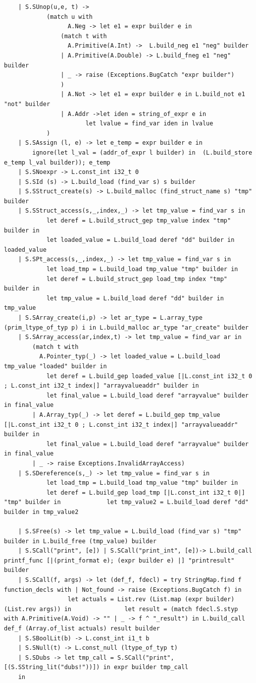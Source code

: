\documentclass{article}
\begin{document}
\begin{lstlisting}
	| S.SUnop(u,e, t) -> 
			(match u with
				  A.Neg -> let e1 = expr builder e in 
				(match t with
				  A.Primitive(A.Int) ->  L.build_neg e1 "neg" builder
				| A.Primitive(A.Double) -> L.build_fneg e1 "neg" builder 
				| _ -> raise (Exceptions.BugCatch "expr builder")
				)
				| A.Not -> let e1 = expr builder e in L.build_not e1 "not" builder
				| A.Addr ->let iden = string_of_expr e in 
					   let lvalue = find_var iden in lvalue
			)
	| S.SAssign (l, e) -> let e_temp = expr builder e in 
		ignore(let l_val = (addr_of_expr l builder) in  (L.build_store e_temp l_val builder)); e_temp
	| S.SNoexpr -> L.const_int i32_t 0
	| S.SId (s) -> L.build_load (find_var s) s builder
	| S.SStruct_create(s) -> L.build_malloc (find_struct_name s) "tmp" builder
	| S.SStruct_access(s,_,index,_) -> let tmp_value = find_var s in 
			let deref = L.build_struct_gep tmp_value index "tmp" builder in 
			let loaded_value = L.build_load deref "dd" builder in loaded_value
	| S.SPt_access(s,_,index,_) -> let tmp_value = find_var s in 
			let load_tmp = L.build_load tmp_value "tmp" builder in 
			let deref = L.build_struct_gep load_tmp index "tmp" builder in 
			let tmp_value = L.build_load deref "dd" builder in tmp_value
	| S.SArray_create(i,p) -> let ar_type = L.array_type (prim_ltype_of_typ p) i in L.build_malloc ar_type "ar_create" builder 
	| S.SArray_access(ar,index,t) -> let tmp_value = find_var ar in 
		(match t with 
		  A.Pointer_typ(_) -> let loaded_value = L.build_load tmp_value "loaded" builder in  
			let deref = L.build_gep loaded_value [|L.const_int i32_t 0 ; L.const_int i32_t index|] "arrayvalueaddr" builder in 
			let final_value = L.build_load deref "arrayvalue" builder in final_value 
		| A.Array_typ(_) -> let deref = L.build_gep tmp_value [|L.const_int i32_t 0 ; L.const_int i32_t index|] "arrayvalueaddr" builder in 
			let final_value = L.build_load deref "arrayvalue" builder in final_value 
		| _ -> raise Exceptions.InvalidArrayAccess)
	| S.SDereference(s,_) -> let tmp_value = find_var s in 
			let load_tmp = L.build_load tmp_value "tmp" builder in 
			let deref = L.build_gep load_tmp [|L.const_int i32_t 0|] "tmp" builder in 			  let tmp_value2 = L.build_load deref "dd" builder in tmp_value2

	| S.SFree(s) -> let tmp_value = L.build_load (find_var s) "tmp" builder in L.build_free (tmp_value) builder
	| S.SCall("print", [e]) | S.SCall("print_int", [e])-> L.build_call printf_func [|(print_format e); (expr builder e) |] "printresult" builder
	| S.SCall(f, args) -> let (def_f, fdecl) = try StringMap.find f function_decls with | Not_found -> raise (Exceptions.BugCatch f) in
			      let actuals = List.rev (List.map (expr builder) (List.rev args)) in 				let result = (match fdecl.S.styp with A.Primitive(A.Void) -> "" | _ -> f ^ "_result") in L.build_call def_f (Array.of_list actuals) result builder
	| S.SBoolLit(b) -> L.const_int i1_t b
	| S.SNull(t) -> L.const_null (ltype_of_typ t)
	| S.SDubs -> let tmp_call = S.SCall("print", [(S.SString_lit("dubs!"))]) in expr builder tmp_call 	
	in



\end{lstlisting}
\end{document}
